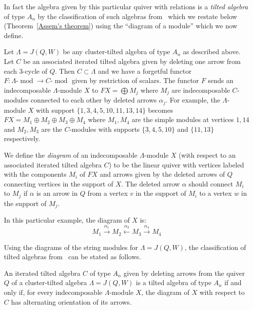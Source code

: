 \documentclass[ALCO,ThmDefs,Unicode,epreuves]{cedram}
\DeclareMathOperator{\modr}{mod}
\begin{document}
In fact the algebra given by this particular quiver with relations is a \emph{tilted algebra} of type $A_n$ by the classification of such algebras from~\cite{Asse} which we restate below (Theorem~\ref{Assem's theorem}) using the ``diagram of a module'' which we now define.

Let $\Lambda=J(Q,W)$ be any cluster-tilted algebra of type $A_n$ as described above. Let $C$ be an associated iterated tilted algebra given by deleting one arrow from each 3-cycle of $Q$. Then $C\subset \Lambda$ and we have a forgetful functor $F:\Lambda\text{-}\modr \to C\text{-}\modr $ given by restriction of scalars. The functor $F$ sends an indecomposable $\Lambda$-module $X$ to $FX=\bigoplus M_j$ where $M_j$ are indecomposable $C$-modules connected to each other by deleted arrows $\alpha_j$. For example, the $\Lambda$-module $X$ with support $\{1,3,4,5,10,11,13,14\}$ becomes $FX=M_1\oplus M_2\oplus M_3\oplus M_4$ where $M_1,M_4$ are the simple modules at vertices $1,14$ and $M_2,M_3$ are the $C$-modules with supports $\{3,4,5,10\}$ and $\{11,13\}$ respectively. 

\begin{defi}\label{def: diagram of a module}
We define the \emph{diagram} of an indecomposable $\Lambda$-module $X$ (with respect to an associated iterated tilted algebra $C$) to be the linear quiver with vertices labeled with the components $M_i$ of $FX$ and arrows given by the deleted arrows of $Q$ connecting vertices in the support of $X$. The deleted arrow $\alpha$ should connect $M_i$ to $M_j$ if $\alpha$ is an arrow in $Q$ from a vertex $v$ in the support of $M_i$ to a vertex $w$ in the support of $M_j$. 
\end{defi}

In this particular example, the diagram of $X$ is:
\[
	M_1\xrightarrow{\alpha_1} M_2\xleftarrow{\alpha_3} M_3\xrightarrow{\alpha_4} M_4
\]

Using the diagrams of the string modules for $\Lambda=J(Q,W)$, the classification of tilted algebras from~\cite{Asse} can be stated as follows.


\begin{theo}[Assem]\label{Assem's theorem}
An iterated tilted algebra $C$ of type $A_n$ given by deleting arrows from the quiver $Q$ of a cluster-tilted algebra $\Lambda=J(Q,W)$ is a tilted algebra of type $A_n$ if and only if, for every indecomposable $\Lambda$-module $X$, the diagram of $X$ with respect to $C$ has alternating orientation of its arrows.
\end{theo}
\end{document}
